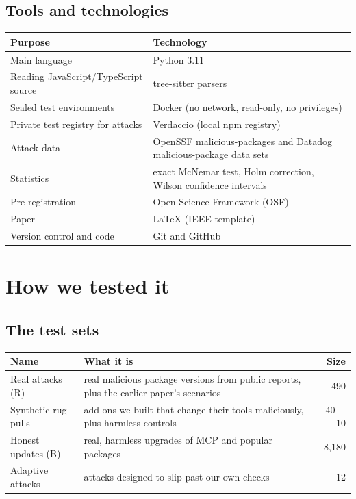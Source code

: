 \documentclass[11pt,a4paper]{article}
\begin{document}
\subsection{Tools and technologies}
\begin{center}
\begin{tabularx}{0.95\textwidth}{@{}lX@{}}
\toprule
\textbf{Purpose} & \textbf{Technology} \\
\midrule
Main language & Python 3.11 \\
Reading JavaScript/TypeScript source & tree-sitter parsers \\
Sealed test environments & Docker (no network, read-only, no privileges) \\
Private test registry for attacks & Verdaccio (local npm registry) \\
Attack data & OpenSSF malicious-packages and Datadog malicious-package data sets \\
Statistics & exact McNemar test, Holm correction, Wilson confidence intervals \\
Pre-registration & Open Science Framework (OSF) \\
Paper & \LaTeX{} (IEEE template) \\
Version control and code & Git and GitHub \\
\bottomrule
\end{tabularx}
\end{center}

\section{How we tested it}

\subsection{The test sets}
\begin{center}
\begin{tabularx}{\textwidth}{@{}l>{\raggedright\arraybackslash}Xr@{}}
\toprule
\textbf{Name} & \textbf{What it is} & \textbf{Size} \\
\midrule
Real attacks (R) & real malicious package versions from public reports, plus the earlier paper's scenarios & 490 \\
Synthetic rug pulls & add-ons we built that change their tools maliciously, plus harmless controls & 40 + 10 \\
Honest updates (B) & real, harmless upgrades of MCP and popular packages & 8,180 \\
Adaptive attacks & attacks designed to slip past our own checks & 12 \\
\bottomrule
\end{tabularx}
\end{center}
\end{document}
